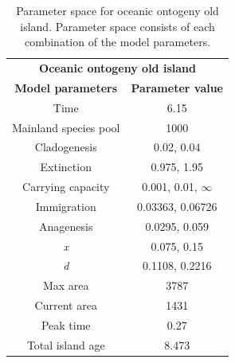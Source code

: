 \begin{table}[ht]
    \centering
    \caption{Parameter space for oceanic ontogeny old island. Parameter space consists of each combination of the model parameters.}
    \begin{tabular}{ c | c }
        \multicolumn{2}{c}{\textbf{Oceanic ontogeny old island}} \\
        \textbf{Model parameters} & \textbf{Parameter value} \\ 
        \hline
        \hline
        Time & 6.15 \\
        \hline
        Mainland species pool & 1000 \\
        \hline
        Cladogenesis & 0.02, 0.04 \\
        \hline
        Extinction & 0.975, 1.95 \\
        \hline
        Carrying capacity & 0.001, 0.01, $\infty$ \\
        \hline
        Immigration & 0.03363, 0.06726 \\
        \hline
        Anagenesis & 0.0295, 0.059 \\
        \hline
        \textit{x} & 0.075, 0.15 \\
        \hline
        \textit{d} & 0.1108, 0.2216 \\
        \hline
        Max area & 3787 \\
        \hline
        Current area & 1431 \\
        \hline
        Peak time & 0.27 \\
        \hline
        Total island age & 8.473 \\
    \end{tabular}
    \label{tab:oceanic_ontogeny_old}
\end{table}

